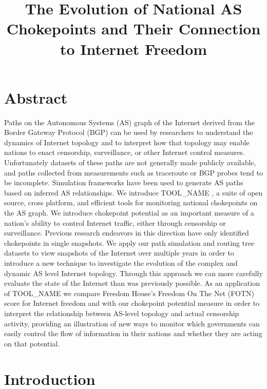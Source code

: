 \documentclass{article}
\title{The Evolution of National AS Chokepoints and Their Connection to
Internet Freedom}
\newcommand{\toolname}{{\color{blue}TOOL\_NAME }}
\begin{document}
\maketitle
\begin{multicols}{2}

\section{Abstract}     
Paths on the Autonomous Systems (AS) graph of the Internet
derived from the Border Gateway Protocol (BGP) can be used by researchers to
understand the dynamics of Internet topology and to interpret how that
topology may enable nations to enact censorship, surveillance, or other
Internet control measures. Unfortunately datasets of these paths are not
generally made publicly available, and paths collected from measurements such as
traceroute or BGP probes tend to be incomplete. Simulation
frameworks have been used to generate AS paths based on inferred AS relationships.
We introduce \toolname, a suite of open source, cross platform, and efficient
tools for monitoring national chokepoints on the AS graph. We introduce chokepoint potential as an important measure of a nation's ability to 
control Internet traffic, either through censorship or surveillance.
Previous research endeavors in this
direction have only identified chokepoints in single snapshots. We apply our
path simulation and routing tree datasets to view snapshots of the Internet
over multiple years in order to introduce a new technique to investigate the
evolution of the complex and dynamic AS level Internet topology. Through this approach we
can more carefully evaluate the state of the Internet than was previously possible. As an
application of \toolname we compare Freedom House's Freedom On The Net (FOTN) score for
Internet freedom and with our chokepoint potential measure in order to interpret
the relationship between AS-level topology and actual censorship activity, providing an
illustration of new ways to monitor which governments can easily control the flow of 
information in their nations and whether they are acting on that potential.

\section{Introduction}


\end{multicols}
\end{document}
